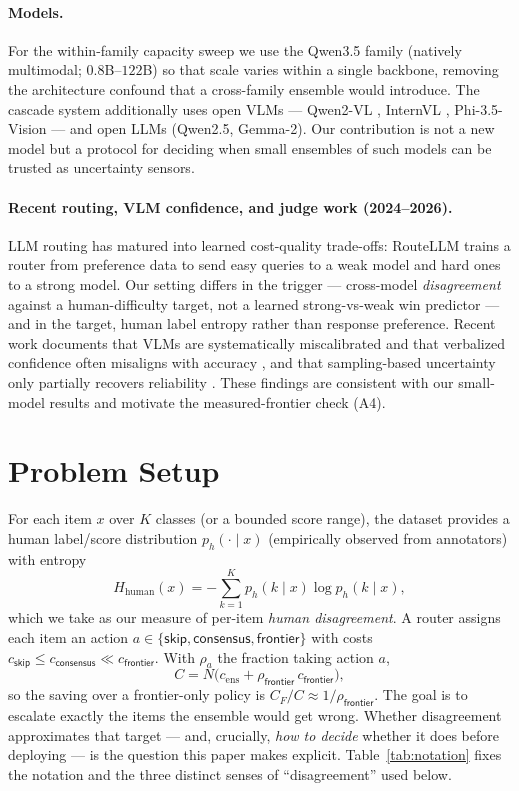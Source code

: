 \documentclass[letterpaper]{article} %
\begin{document}
\paragraph{Models.}
For the within-family capacity sweep we use the Qwen3.5 family (natively
multimodal; $0.8$B--$122$B) so that scale varies within a single backbone, removing
the architecture confound that a cross-family ensemble would introduce. The
cascade system additionally uses open VLMs --- Qwen2-VL \citep{wang2024qwen2vl},
InternVL \citep{chen2024internvl}, Phi-3.5-Vision \citep{abdin2024phi3} --- and
open LLMs (Qwen2.5, Gemma-2). Our contribution is not a new model but a protocol
for deciding when small ensembles of such models can be trusted as uncertainty
sensors.

\paragraph{Recent routing, VLM confidence, and judge work (2024--2026).}
LLM routing has matured into learned cost-quality trade-offs: RouteLLM
\citep{ong2024routellm} trains a router from preference data to send easy queries
to a weak model and hard ones to a strong model. Our setting differs in the
trigger --- cross-model \emph{disagreement} against a human-difficulty target, not a
learned strong-vs-weak win predictor --- and in the target, human label entropy
rather than response preference. Recent work documents that VLMs are
systematically miscalibrated and that verbalized confidence often misaligns with
accuracy \citep{groot2024verbalized}, and that sampling-based uncertainty only
partially recovers reliability \citep{zhang2024vluncertainty}. These findings are
consistent with our small-model results and motivate the measured-frontier check
(A4).

\section{Problem Setup}
For each item $x$ over $K$ classes (or a bounded score range), the dataset provides
a human label/score distribution $p_h(\cdot\mid x)$ (empirically observed from
annotators) with entropy
\begin{equation}
H_{\text{human}}(x) = -\sum_{k=1}^{K} p_h(k\mid x)\log p_h(k\mid x),
\end{equation}
which we take as our measure of per-item \emph{human disagreement}. A router
assigns each item an action
$a\in\{\textsf{skip},\textsf{consensus},\textsf{frontier}\}$ with costs
$c_{\textsf{skip}}\le c_{\textsf{consensus}}\ll c_{\textsf{frontier}}$. With
$\rho_a$ the fraction taking action $a$,
\begin{equation}
C = N\big(c_{\text{ens}} + \rho_{\textsf{frontier}}\,c_{\textsf{frontier}}\big),
\label{eq:cost}
\end{equation}
so the saving over a frontier-only policy is $C_F/C\approx
1/\rho_{\textsf{frontier}}$. The goal is to escalate exactly the items the
ensemble would get wrong. Whether disagreement approximates that target ---
and, crucially, \emph{how to decide} whether it does before deploying --- is the
question this paper makes explicit. Table~\ref{tab:notation} fixes the notation and
the three distinct senses of ``disagreement'' used below.
\end{document}
